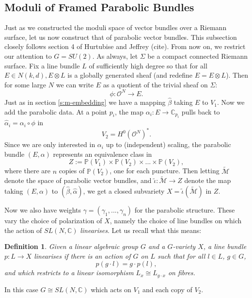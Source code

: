 \documentclass[]{article}
\newtheorem{definition}{Definition}
\newcommand{\C}{\mathbb{C}}
\newcommand{\OO}{\mathcal{O}}
\newcommand{\MM}{\mathcal{M}}
\newcommand{\PP}{\mathbb{P}}
\begin{document}
	\subsection{Moduli of Framed Parabolic Bundles}
	Just as we constructed the moduli space of vector bundles over a Riemann surface, let us now construct that of parabolic vector bundles. This subsection closely follows section 4 of Hurtubise and Jeffrey (cite). From now on, we restrict our attention to $G=SU(2)$. As always, let $\Sigma$ be a compact connected Riemann surface. Fix a line bundle $L$ of sufficiently high degree so that for all $E\in N(k,d), E\otimes L$ is a globally generated sheaf (and redefine $E = E\otimes L$). Then for some large $N$ we can write $E$ as a quotient of the trivial sheaf on $\Sigma$:
	\begin{equation}
		\phi: \OO^N \to E.
	\end{equation}
	Just as in section \ref{s:m-embedding} we have a mapping $\hat{\beta}$ taking $E$ to $V_1$. Now we add the parabolic data. At a point $p_i$, the map $\alpha_i:E\to \C_{p_i}$ pulls back to $\hat{\alpha}_i = \alpha_i\circ \phi$ in 
	\begin{equation}
		V_2 = H^0(\OO^N)^\ast.
	\end{equation}
	Since we are only interested in $\alpha_i$ up to (independent) scaling, the parabolic bundle $(E,\alpha)$ represents an equivalence class in
	\begin{equation}
		Z := \PP(V_1) \times \PP(V_2) \times ... \times \PP(V_2),
	\end{equation}
	where there are $n$ copies of $\PP(V_2)$, one for each puncture. Then letting $\tilde{\MM}$ denote the space of parabolic vector bundles, and $\tilde{\iota}:\tilde{\MM}\to Z$ denote the map taking $(E,\alpha)$ to $(\hat{\beta},\hat{\alpha})$, we get a closed subvariety $X = \tilde{\iota}\left(\tilde{\MM}\right)$ in $Z$. 

	Now we also have weights $\gamma = (\gamma_1,...,\gamma_n)$ for the parabolic structure. These vary the choice of polarization of $X$, namely the choice of line bundles on which the action of $SL(N,\C)$ \textit{linearises}. Let us recall what this means:
	\begin{definition}
		Given a linear algebraic group $G$ and a $G$-variety $X$, a line bundle $p:L\to X$ \emph{linearises} if there is an action of $G$ on $L$ such that for all $l\in L$, $g\in G$,
		\begin{equation}
			p(g\cdot l) = g\cdot p(l),
		\end{equation}
		and which restricts to a linear isomorphism $L_x \cong L_{g\cdot x}$ on fibres.
	\end{definition}
	In this case $G\cong SL(N,\C)$ which acts on $V_1$ and each copy of $V_2$.
	
\end{document}
